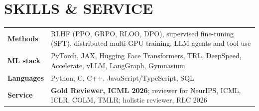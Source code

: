 \documentclass[10pt]{article}
\begin{document}
\section{SKILLS \& SERVICE}
\begin{tabularx}{\linewidth}{@{}l >{\raggedright\arraybackslash}X@{}}
  \textbf{Methods}   & RLHF (PPO, GRPO, RLOO, DPO), supervised fine-tuning (SFT), distributed multi-GPU training, LLM agents and tool use \\
  \textbf{ML stack}  & PyTorch, JAX, Hugging Face Transformers, TRL, DeepSpeed, Accelerate, vLLM, LangGraph, Gymnasium \\
  \textbf{Languages} & Python, C, C++, JavaScript/TypeScript, SQL \\
  \textbf{Service}   & \textbf{Gold Reviewer, ICML 2026}; reviewer for NeurIPS, ICML, ICLR, COLM, TMLR; holistic reviewer, RLC 2026 \\
\end{tabularx}
\end{document}

